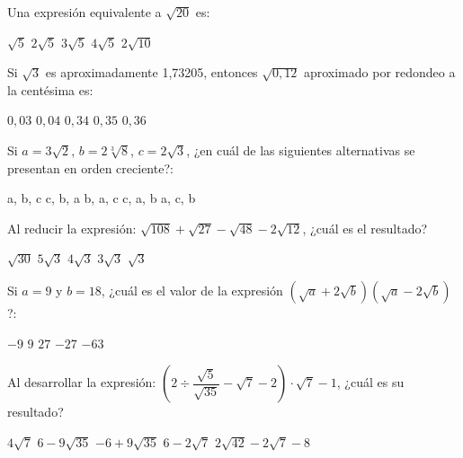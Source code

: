 \documentclass[]{srs}
\begin{document}
\begin{preguntas}[after-item-skip=2cm]
  \pregunta Una expresión equivalente a $\sqrt{20}$ es: \\
  \begin{vertical}
    \alternativa $\sqrt{5}$
    \alternativa $2\sqrt{5}$
    \alternativa $3\sqrt{5}$
    \alternativa $4\sqrt{5}$
    \alternativa $2\sqrt{10}$

  \end{vertical}

  \pregunta Si $\sqrt{3}$ es aproximadamente 1,73205, entonces $\sqrt{0,12}$ aproximado
  por redondeo a la centésima es: \\
  \begin{vertical}
    \alternativa $0,03$
    \alternativa $0,04$
    \alternativa $0,34$
    \alternativa $0,35$
    \alternativa $0,36$
  \end{vertical}

  \pregunta Si $a=3\sqrt{2}$, $b=2\sqrt[3]{8}$, $c=2\sqrt{3}$, ¿en cuál de las siguientes
  alternativas se presentan en orden creciente?: \\
  \begin{vertical}
    \alternativa a, b, c
    \alternativa c, b, a
    \alternativa b, a, c
    \alternativa c, a, b
    \alternativa a, c, b
  \end{vertical}

  \pregunta Al reducir la expresión: $\sqrt{108} + \sqrt{27} - \sqrt{48} - 2\sqrt{12}$,
  ¿cuál es el resultado? \\
  \begin{vertical}
    \alternativa $\sqrt{30}$
    \alternativa $5\sqrt{3}$
    \alternativa $4\sqrt{3}$
    \alternativa $3\sqrt{3}$
    \alternativa $\sqrt{3}$
  \end{vertical}

  \pregunta Si $a=9$ y $b=18$, ¿cuál es el valor de la expresión
  $\left(\sqrt{a}+2\sqrt{b}\right)\left(\sqrt{a}-2\sqrt{b}\right)$?: \\
  \begin{vertical}
    \alternativa $-9$
    \alternativa $9$
    \alternativa $27$
    \alternativa $-27$
    \alternativa $-63$
  \end{vertical}

  \pregunta Al desarrollar la expresión:
  $\left(2\div\dfrac{\sqrt{5}}{\sqrt{35}}-\sqrt{7}-2\right)\cdot\sqrt{7} -1$,
  ¿cuál es su resultado? \\
  \begin{vertical}
    \alternativa $4\sqrt{7}$
    \alternativa $6-9\sqrt{35}$
    \alternativa $-6+9\sqrt{35}$
    \alternativa $6-2\sqrt{7}$
    \alternativa $2\sqrt{42}-2\sqrt{7} -8$
  \end{vertical}


\end{preguntas}
\end{document}
